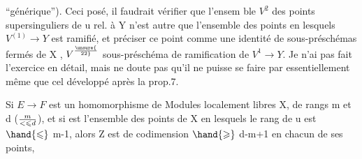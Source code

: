 
 ``générique'').   Ceci posé, il faudrait vérifier que l'ensem ble $V^2$
des points supersinguliers de u rel. à Y n'est autre que l'ensemble des
points en lesquels $V^{(1)} \longrightarrow Y$ est ramifié, et préciser ce point
comme une identité de sous-préschémas fermés de X , $V^{\unsure{\over{2}{2}}}$ \over{=}{=} sous-préschéma
de ramification de $V^1 \longrightarrow Y$. Je n'ai pas fait l'exercice en détail,
mais ne doute pas qu'il ne puisse se faire par essentiellement  même
  que cel développé après la prop.7.

 Si $E \longrightarrow F$ est un homomorphisme de Modules localement libres  
X, de rangs m et d ($m \over{<}{\leqslant} d$), et si  est l'ensemble des points de X en
lesquels le rang de u est $\hand{\leqslant}$ m-1, alors  Z est de codimension $\hand{\geqslant}$ d-m+1
en chacun de ses points, 


